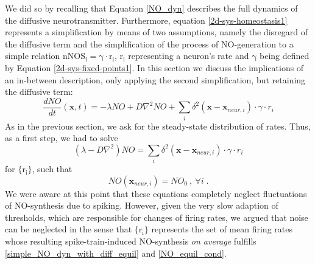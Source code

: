 \documentclass[10pt,a4paper]{article}
\begin{document}
We did so by recalling that Equation \eqref{NO_dyn} describes the full dynamics of the diffusive neurotransmitter. Furthermore, equation \eqref{2d-sys-homeostasis1} represents a simplification by means of two assumptions, namely the disregard of the diffusive term and the simplification of the process of NO-generation to a simple relation $\mathrm{nNOS_i = \gamma \cdot r_i}$, $\mathrm{r_i}$ representing a neuron's rate and $\mathrm{\gamma}$ being defined by Equation \eqref{2d-sys-fixed-points1}. In this section we discuss the implications of an in-between description, only applying the second simplification, but retaining the diffusive term:
\begin{equation}
\frac{dNO}{dt}(\mathbf{x},t) =-\lambda NO + D \nabla^2 NO + \sum_{i} \delta^2(\mathbf{x}-\mathbf{x}_{neur,i})\cdot \gamma \cdot r_i
\label{simple_NO_dyn_with_diff}
\end{equation}
As in the previous section, we ask for the steady-state distribution of rates. Thus, as a first step, we had to solve
\begin{equation}
(\lambda - D \nabla^2) NO = \sum_{i} \delta^2(\mathbf{x}-\mathbf{x}_{neur,i})\cdot \gamma \cdot r_i
\label{simple_NO_dyn_with_diff_equil}
\end{equation}
for $\mathrm{\lbrace r_i\rbrace}$, such that
\begin{equation}
NO(\mathbf{x}_{neur,i}) = NO_0 \:, \: \forall i \; .
\label{NO_equil_cond}
\end{equation}
We were aware at this point that these equations completely neglect fluctuations of NO-synthesis due to spiking. However, given the very slow adaption of thresholds, which are responsible for changes of firing rates, we argued that noise can be neglected in the sense that $\mathrm{\lbrace r_i\rbrace}$ represents the set of mean firing rates whose resulting spike-train-induced NO-synthesis \emph{on average} fulfills \eqref{simple_NO_dyn_with_diff_equil} and \eqref{NO_equil_cond}.
  
\end{document}
